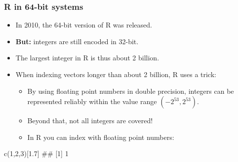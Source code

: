 \begin{vbframe}
\frametitle{R in 64-bit systems}
\begin{itemize}
  \item In 2010, the 64-bit version of R was released.
  \item \textbf{But:} integers are still encoded in 32-bit.
  \item The largest integer in R is thus about 2 billion.
  \item When indexing vectors longer than about 2 billion, R uses a trick:
  \begin{itemize}
    \item By using floating point numbers in double precision, integers can be represented reliably within the value range $(-2^{53}, 2^{53})$.
    \item Beyond that, not all integers are covered!
    \item In R you can index with floating point numbers:
  \end{itemize}
\end{itemize}

\footnotesize
\lz
\begin{verbbox}
c(1,2,3)[1.7]
## [1] 1
\end{verbbox}
\col
\end{vbframe}



\endlecture



